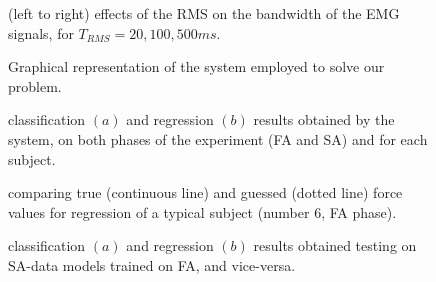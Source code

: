 \documentclass[10pt]{bmc_article}
\def\texttt{[image: ]}
\newenvironment{bmcformat}{\begin{raggedright}\baselineskip20pt\sloppy\setboolean{publ}{false}}{\end{raggedright}\baselineskip20pt\sloppy}
\begin{document}
\begin{bmcformat}
\begin{figure}[!ht] \centering
  \caption{(left to right) effects of the RMS on the bandwidth of the EMG
    signals, for $T_{RMS} = 20, 100, 500ms$.}
  \label{fig:RMSs}
\end{figure}

\begin{figure}[!ht] \centering
  \caption{Graphical representation of the system employed to solve our problem.}
  \label{fig:Algorithm}
\end{figure}

\begin{figure}[!ht] \centering
  \caption{classification $(a)$ and regression $(b)$ results obtained
    by the system, on both phases of the experiment (FA and SA) and
    for each subject.}
  \label{fig:results}
\end{figure}

\begin{figure}[!ht] \centering
  \caption{comparing true (continuous line) and guessed (dotted line) force values for regression of a
    typical subject (number $6$, FA phase).}
  \label{fig:examples}
\end{figure}

\begin{figure}[!ht] \centering
  \caption{classification $(a)$ and regression $(b)$ results obtained
    testing on SA-data models trained on FA, and vice-versa.}
  \label{fig:2on1}
\end{figure}


\end{bmcformat}
\end{document}
